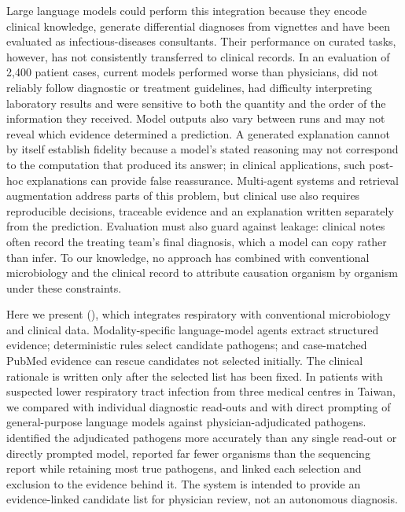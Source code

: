 Large language models could perform this integration because they encode clinical knowledge\cite{singhal2023large}, generate differential diagnoses from vignettes\cite{mcduff2025towards,tu2025towards} and have been evaluated as infectious-diseases consultants\cite{maillard2024chatbot}. Their performance on curated tasks, however, has not consistently transferred to clinical records. In an evaluation of 2,400 patient cases, current models performed worse than physicians, did not reliably follow diagnostic or treatment guidelines, had difficulty interpreting laboratory results and were sensitive to both the quantity and the order of the information they received\cite{hager2024evaluation}. Model outputs also vary between runs and may not reveal which evidence determined a prediction\cite{ji2023survey}. A generated explanation cannot by itself establish fidelity because a model's stated reasoning may not correspond to the computation that produced its answer\cite{turpin2023language}; in clinical applications, such post-hoc explanations can provide false reassurance\cite{ghassemi2021false}. Multi-agent systems\cite{tang2024medagents,kim2024mdagents,qiu2024llm} and retrieval augmentation\cite{lewis2020retrieval,xiong2024benchmarking} address parts of this problem, but clinical use also requires reproducible decisions, traceable evidence and an explanation written separately from the prediction. Evaluation must also guard against leakage\cite{kapoor2023leakage}: clinical notes often record the treating team's final diagnosis, which a model can copy rather than infer. To our knowledge, no approach has combined \mngs with conventional microbiology and the clinical record to attribute causation organism by organism under these constraints.

Here we present \toolname (\toolexpansion), which integrates respiratory \mngs with conventional microbiology and clinical data. Modality-specific language-model agents extract structured evidence; deterministic rules select candidate pathogens; and case-matched PubMed evidence can rescue candidates not selected initially. The clinical rationale is written only after the selected list has been fixed. In patients with suspected lower respiratory tract infection from three medical centres in Taiwan, we compared \toolname with individual diagnostic read-outs and with direct prompting of general-purpose language models against physician-adjudicated pathogens. \toolname identified the adjudicated pathogens more accurately than any single read-out or directly prompted model, reported far fewer organisms than the sequencing report while retaining most true pathogens, and linked each selection and exclusion to the evidence behind it. The system is intended to provide an evidence-linked candidate list for physician review, not an autonomous diagnosis.
